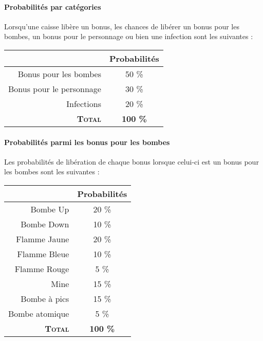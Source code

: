 \paragraph{Probabilités par catégories}
Lorsqu'une caisse libère un bonus, les chances de libérer un bonus pour les bombes, un bonus pour le personnage ou bien une infection sont les suivantes :\begin{center}
\begin{tabular}{|r|c|}
\hline 
& Probabilités \\ 
\hline 
Bonus pour les bombes & 50 \% \\ 
\hline 
Bonus pour le personnage & 30 \% \\ 
\hline 
Infections & 20 \% \\ 
\hline 
\textbf{\textsc{Total}} & \textbf{100 \%} \\ 
\hline 
\end{tabular} 
\end{center}

\paragraph{Probabilités parmi les bonus pour les bombes}
Les probabilités de libération de chaque bonus lorsque celui-ci est un bonus pour les bombes sont les suivantes :\begin{center}
\begin{tabular}{|r|c|}
\hline 
& Probabilités \\ 
\hline 
Bombe Up & 20 \% \\ 
\hline 
Bombe Down & 10 \% \\ 
\hline 
Flamme Jaune & 20 \% \\ 
\hline 
Flamme Bleue & 10 \% \\ 
\hline 
Flamme Rouge & 5 \% \\ 
\hline 
Mine & 15 \% \\ 
\hline 
Bombe à pics & 15 \% \\ 
\hline 
Bombe atomique & 5 \% \\ 
\hline 
\textbf{\textsc{Total}} & \textbf{100 \%} \\ 
\hline 
\end{tabular} 
\end{center}

